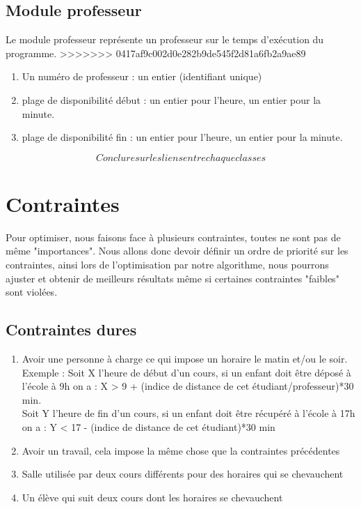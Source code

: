 \documentclass[a4paper,11pt]{article}
\begin{document}
\begin{enumerate}
	\subsection{Module professeur}
		Le module professeur représente un professeur sur le temps d'exécution du programme.
>>>>>>> 0417af9c002d0e282b9de545f2d81a6fb2a9ae89
		\begin{enumerate}
			\item Un numéro de professeur : un entier (identifiant unique)
			\item plage de disponibilité début : un entier pour l'heure, un entier pour la minute.
			\item plage de disponibilité fin : un entier pour l'heure, un entier pour la minute.
			\end{enumerate}
	$$Conclure sur les liens entre chaque classes$$

\section{Contraintes}
	Pour optimiser, nous faisons face à plusieurs contraintes, toutes ne sont pas 
	de même "importances". Nous allons donc devoir définir un ordre de priorité sur 
	les contraintes, ainsi lors de l'optimisation par notre algorithme, nous 
	pourrons ajuster et obtenir de meilleurs résultats même si certaines contraintes
	"faibles" sont violées.\\
	\subsection{Contraintes dures}
		\begin{enumerate}
<<<<<<< HEAD
			\item Avoir une personne à charge ce qui impose un horaire le matin et/ou le soir.\\
			Exemple : Soit X l'heure de début d'un cours, si un enfant doit être déposé à l'école à 9h on a : X > 9 + (indice de distance de cet étudiant/professeur)*30 min.\\
			Soit Y l'heure de fin d'un cours, si un enfant doit être récupéré à l'école à 17h on a : Y < 17 - (indice de distance de cet étudiant)*30 min
			\item Avoir un travail, cela impose la même chose que la contraintes précédentes
			\item Salle utilisée par deux cours différents pour des horaires 
			qui se chevauchent
			\item Un élève qui suit deux cours dont les horaires se chevauchent
		\end{enumerate}

\end{enumerate}
\end{document}
